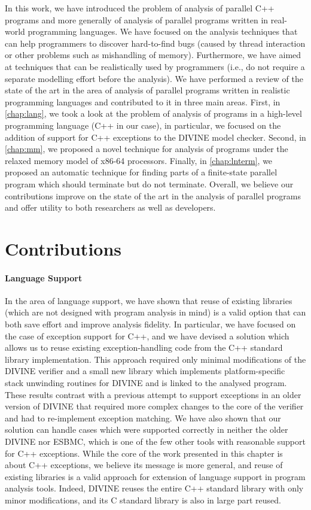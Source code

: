 In this work, we have introduced the problem of analysis of parallel C++ programs and more generally of analysis of parallel programs written in real-world programming languages.
We have focused on the analysis techniques that can help programmers to discover hard-to-find bugs (caused by thread interaction or other problems such as mishandling of memory).
Furthermore, we have aimed at techniques that can be realistically used by programmers (i.e., do not require a separate modelling effort before the analysis).
We have performed a review of the state of the art in the area of analysis of parallel programs written in realistic programming languages and contributed to it in three main areas.
First, in \autoref{chap:lang}, we took a look at the problem of analysis of programs in a high-level programming language (C++ in our case), in particular, we focused on the addition of support for C++ exceptions to the DIVINE model checker.
Second, in \autoref{chap:mm}, we proposed a novel technique for analysis of programs under the relaxed memory model of x86-64 processors.
Finally, in \autoref{chap:lnterm}, we proposed an automatic technique for finding parts of a finite-state parallel program which should terminate but do not terminate.
Overall, we believe our contributions improve on the state of the art in the analysis of parallel programs and offer utility to both researchers as well as developers.

\section{Contributions}

\paragraph{Language Support}

In the area of language support, we have shown that reuse of existing libraries (which are not designed with program analysis in mind) is a valid option that can both save effort and improve analysis fidelity.
In particular, we have focused on the case of exception support for C++, and we have devised a solution which allows us to reuse existing exception-handling code from the C++ standard library implementation.
This approach required only minimal modifications of the DIVINE verifier and a small new library which implements platform-specific stack unwinding routines for DIVINE and is linked to the analysed program.
These results contrast with a previous attempt to support exceptions in an older version of DIVINE that required more complex changes to the core of the verifier and had to re-implement exception matching.
We have also shown that our solution can handle cases which were supported correctly in neither the older DIVINE nor ESBMC, which is one of the few other tools with reasonable support for C++ exceptions.
While the core of the work presented in this chapter is about C++ exceptions, we believe its message is more general, and reuse of existing libraries is a valid approach for extension of language support in program analysis tools.
Indeed, DIVINE reuses the entire C++ standard library with only minor modifications, and its C standard library is also in large part reused.

